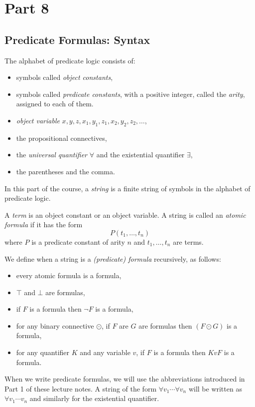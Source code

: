 \section{Part 8}
\subsection{Predicate Formulas: Syntax}

The alphabet of predicate logic consists of:
\begin{itemize}
 \item symbols called \textit{object constants}, 
 \item symbols called \textit{predicate constants}, with a positive integer, called the \textit{arity}, assigned to each of them. 
 \item \textit{object variable} $x, y, z, x_1, y_1, z_1, x_2, y_2, z_2, \ldots$, \item the propositional connectives,
 \item the \textit{universal quantifier} $\forall$ and the existential quantifier $\exists$,
 \item the parentheses and the comma.
\end{itemize}
In this part of the course, a \textit{string} is a finite string of symbols in the alphabet of predicate logic. 

A \textit{term} is an object constant or an object variable. A string is called an \textit{atomic formula} if it has the form 
\begin{equation*}
P(t_1, \ldots, t_n)
\end{equation*}
where $P$ is a predicate constant of arity $n$ and $t_1, \ldots, t_n$ are terms. 

We define when a string is a \textit{(predicate) formula} recursively, as follows:
\begin{itemize}
\item every atomic formula is a formula, 
\item $\top$ and $\bot$ are formulas, 
\item if $F$ is a formula then $\neg F$ is a formula,  
\item for any binary connective $\odot$, if $F$ are $G$ are formulas then $(F \odot G)$ is a formula, 
\item for any quantifier $K$ and any variable $v$, if $F$ is a formula then $KvF$ is a formula.  
\end{itemize}

When we write predicate formulas, we will use the abbreviations introduced in Part 1 of these lecture notes. A string of the form $\forall v_1 \cdots \forall v_n$ will be written as $\forall v_1 \cdots v_n$ and similarly for the existential quantifier. 

